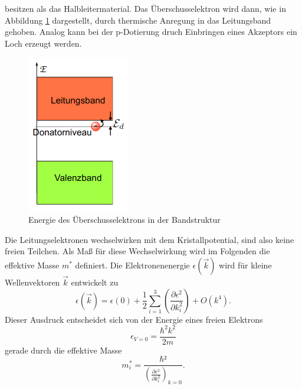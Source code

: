 besitzen als das Halbleitermaterial. Das Überschusselektron wird dann, wie in Abbildung \ref{fig:Donatorenergie} dargestellt, durch thermische Anregung in das
Leitungsband gehoben. Analog kann bei der p-Dotierung druch Einbringen eines Akzeptors ein Loch erzeugt werden. 
\begin{figure}[H]
    \centering
    \includegraphics[scale=0.8]{pictures/Donatorelektron.png}
    \caption{Energie des Überschusselektrons in der Bandstruktur}
    \label{fig:Donatorenergie}
\end{figure}
\noindent
Die Leitungselektronen wechselwirken mit dem Kristallpotential, sind also keine freien Teilchen. Als Maß für diese Wechselwirkung wird im Folgenden die 
effektive Masse $m^*$ definiert. Die Elektronenenergie $\epsilon(\vec{k})$ wird für kleine Wellenvektoren $\vec{k}$ entwickelt zu
\begin{equation}
    \epsilon(\vec{k})=\epsilon(0)+\frac{1}{2}\sum_{i=1}^3\left(\frac{\partial \epsilon^2}{\partial k_i^2}\right)+O(k^4) .
    \label{eqn:Taylor}
\end{equation}
Dieser Ausdruck entscheidet sich von der Energie eines freien Elektrons
\begin{equation*}
    \epsilon_{V=0}=\frac{\hbar^2 k^2}{2m}
\end{equation*}
gerade durch die effektive Masse
\begin{equation*}
    m_i^*=\frac{\hbar²}{\left(\frac{\partial \epsilon^2}{\partial k_i^2}\right)_{k=0}} .
\end{equation*}

